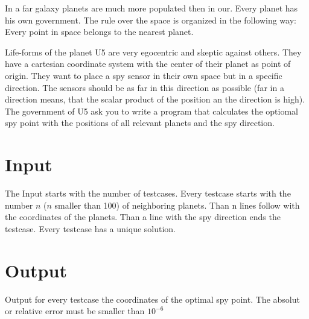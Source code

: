 
In a far galaxy planets are much more populated then in our. 
Every planet has his own government. 
The rule over the space is organized in the following way: 
Every point in space belongs to the nearest planet.

Life-forms of the planet U5 are very egocentric and skeptic against others.
They have a cartesian coordinate system with the center of their planet as point of origin.
They want to place a spy sensor in their own space but in a specific direction.
The sensors should be as far in this direction as possible
(far in a direction means, that the scalar product of the position an the direction is high).
The government of U5 ask you to write a program that calculates the optiomal spy point with the positions of all relevant planets and the spy direction. 

\section*{Input}

The Input starts with the number of testcases.
Every testcase starts with the number $n$ ($n$ smaller than 100) of neighboring planets.
Than n lines follow with the coordinates of the planets.
Than a line with the spy direction ends the testcase.
Every testcase has a unique solution.

\section*{Output}
Output for every testcase the coordinates of the optimal spy point.
The absolut or relative error must be smaller than $10^{-6}$
